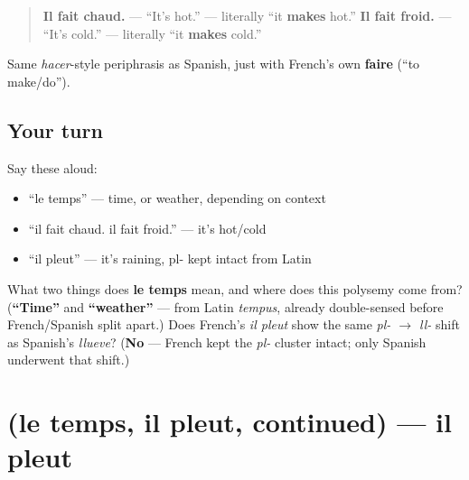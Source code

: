 \begin{grammarlens}[title={Grammar Lens: il fait chaud / il fait froid}]
\begin{quote}
\textbf{Il fait chaud.} — \textquotedblleft{}It's hot.\textquotedblright{} — literally \textquotedblleft{}it \textbf{makes} hot.\textquotedblright{} \textbf{Il fait froid.} — \textquotedblleft{}It's cold.\textquotedblright{} — literally \textquotedblleft{}it \textbf{makes} cold.\textquotedblright{}
\end{quote}

Same \emph{hacer}-style periphrasis as Spanish, just with French's own \textbf{faire} (\textquotedblleft{}to make/do\textquotedblright{}).
\end{grammarlens}

\subsection*{Your turn}
Say these aloud:

\begin{itemize}
\raggedright
  \item \textquotedblleft{}le temps\textquotedblright{} — time, or weather, depending on context
  \item \textquotedblleft{}il fait chaud. il fait froid.\textquotedblright{} — it's hot/cold
  \item \textquotedblleft{}il pleut\textquotedblright{} — it's raining, pl- kept intact from Latin
\end{itemize}

\begin{tcolorbox}[breakable,colback=teal!4,colframe=teal!35!black,title={Before you move on}]
What two things does \textbf{le temps} mean, and where does this polysemy come from? (\textbf{\textquotedblleft{}Time\textquotedblright{}} and \textbf{\textquotedblleft{}weather\textquotedblright{}} — from Latin \emph{tempus}, already double-sensed before French/Spanish split apart.) Does French's \emph{il pleut} show the same \emph{pl- $\to$ ll-} shift as Spanish's \emph{llueve}? (\textbf{No} — French kept the \emph{pl-} cluster intact; only Spanish underwent that shift.)
\end{tcolorbox}
\section[(le temps, il pleut, continued)]{(le temps, il pleut, continued) — il pleut}

\label{lesson:FR-C21-le-temps-more}




